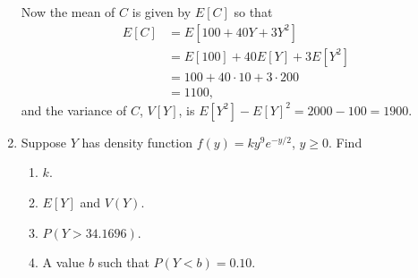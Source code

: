 \documentclass[9pt]{article}
\begin{document}
\begin{enumerate}
      Now the mean of $C$ is given by $E[C]$ so that
      \begin{align*}
         E[C] &= E[100 + 40Y + 3Y^2] \\
            &= E[100] + 40E[Y] + 3E[Y^2] \\
            &= 100 + 40 \cdot 10 + 3 \cdot 200 \\
            &= 1100,
      \end{align*}
      and the variance of $C$, $V[Y]$, is
      $E[Y^2] - E[Y]^2 = 2000 - 100 = 1900$.
   \item Suppose $Y$ has density function $f(y) = ky^9e^{-y/2}$, $y \ge 0$.
         Find
         \begin{enumerate}
            \item $k$.
            \item $E[Y]$ and $V(Y)$.
            \item $P(Y > 34.1696)$.
            \item A value $b$ such that $P(Y < b) = 0.10$.
         \end{enumerate}


\end{enumerate}
\end{document}
